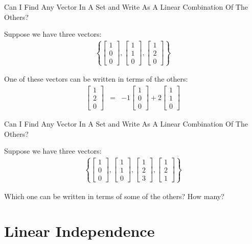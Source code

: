 \documentclass[svgnames,table,,aspectratio=169]{beamer}
\newcommand{\columnVector}[1]{%
  \left[
    \begin{array}{r}
    #1                           
    \end{array}
  \right]
}
\begin{document}
\begin{frame}{Can I Find Any Vector In A Set and Write As A Linear
    Combination Of The Others?}

  Suppose we have three vectors:
  \begin{eqnarray*}
    \left\{
    \columnVector{1 \\ 0 \\ 0},
    \columnVector{1 \\ 1 \\ 0},
    \columnVector{1 \\ 2 \\ 0}
    \right\}
  \end{eqnarray*}

  One of these vectors can be written in terms of the others:
  \begin{eqnarray*}
    \columnVector{ 1 \\ 2 \\ 0}
    & = &
          -1 \columnVector{1 \\ 0 \\ 0} +
    2 \columnVector{1 \\ 1 \\ 0} 
  \end{eqnarray*}


\end{frame}

\begin{frame}{Can I Find Any Vector In A Set and Write As A Linear
    Combination Of The Others?}

  Suppose we have three vectors:
  \begin{eqnarray*}
    \left\{
    \columnVector{1 \\ 0 \\ 0},
    \columnVector{1 \\ 1 \\ 0},
    \columnVector{1 \\ 2 \\ 3},
    \columnVector{1 \\ 2 \\ 1}
    \right\}
  \end{eqnarray*}

  Which one can be written in terms of some of the others? How many?

\end{frame}


\section{Linear Independence}
\end{document}
